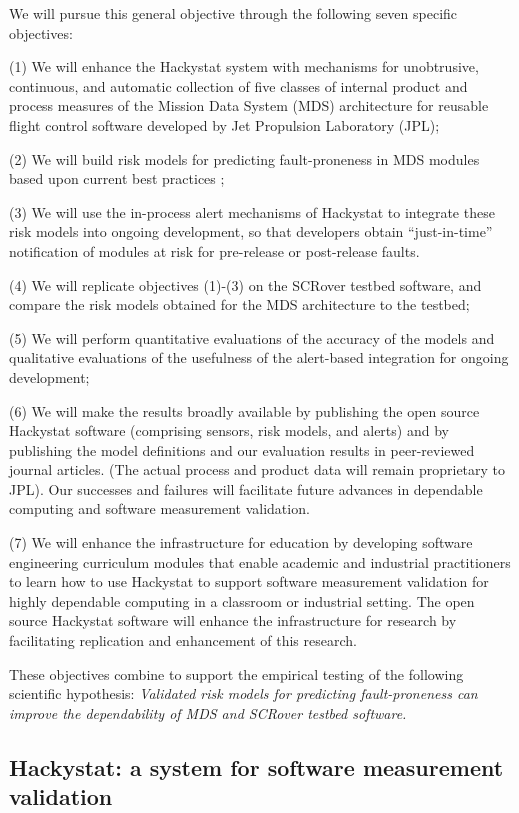 We will pursue this general objective through the following seven specific
objectives: 

(1) We will enhance the Hackystat system \cite{Hackystat} with mechanisms
for unobtrusive, continuous, and automatic collection of five classes of
internal product and process measures of the Mission Data System (MDS)
architecture for reusable flight control software developed by Jet
Propulsion Laboratory (JPL);

(2) We will build risk models for predicting fault-proneness in MDS
modules based upon current best practices \cite{Basili96,Briand01,Emam00,Boehm89};

(3) We will use the in-process alert mechanisms of Hackystat to integrate
these risk models into ongoing development, so that developers obtain
``just-in-time'' notification of modules at risk for pre-release or
post-release faults.

(4) We will replicate objectives (1)-(3) on the SCRover testbed software,
and compare the risk models obtained for the MDS architecture to the
testbed;

(5) We will perform quantitative evaluations of the accuracy of the
models and qualitative evaluations of the usefulness of the
alert-based integration for ongoing development;
    
(6) We will make the results broadly available by publishing the open
source Hackystat software (comprising sensors, risk models, and alerts)
and by publishing the model definitions and our evaluation results in
peer-reviewed journal articles. (The actual process and product data will
remain proprietary to JPL). Our successes and failures will facilitate
future advances in dependable computing and software measurement validation.

(7) We will enhance the infrastructure for education by
developing software engineering curriculum modules that enable academic and
industrial practitioners to learn how to use Hackystat to support software
measurement validation for highly dependable computing in a classroom or
industrial setting.  The open source Hackystat software will enhance the
infrastructure for research by facilitating replication and enhancement of this
research.

These objectives combine to support the empirical testing of the following
scientific hypothesis:  {\em Validated risk models for predicting
fault-proneness can improve the dependability of MDS and SCRover testbed software.}

\subsection{Hackystat: a system for software measurement validation}

